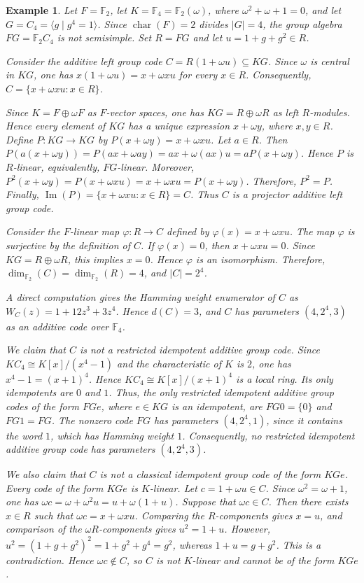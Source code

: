 \documentclass[11pt]{article}
\newtheorem{example}[theorem]{Example}
\begin{document}
\begin{example}\label{ex:nonsemisimple-projector}
Let $F=\mathbb{F}_2$, let
$K=\mathbb{F}_4=\mathbb{F}_2(\omega)$, where
$\omega^2+\omega+1=0$, and let
$G=C_4=\langle g\mid g^4=1\rangle$. Since
$\operatorname{char}(F)=2$ divides $|G|=4$, the group algebra
$FG=\mathbb{F}_2C_4$ is not semisimple. Set $R=FG$ and let
$u=1+g+g^2\in R$.

Consider the additive left group code
$C=R(1+\omega u)\subseteq KG$. Since $\omega$ is central in $KG$, one has
$x(1+\omega u)=x+\omega xu$ for every $x\in R$. Consequently,
$C=\{x+\omega xu:x\in R\}$.

Since $K=F\oplus\omega F$ as $F$-vector spaces, one has
$KG=R\oplus\omega R$ as left $R$-modules. Hence every element of $KG$ has a
unique expression $x+\omega y$, where $x,y\in R$. Define
$P:KG\longrightarrow KG$ by $P(x+\omega y)=x+\omega xu$. Let $a\in R$.
Then $P(a(x+\omega y))=P(ax+\omega ay)=ax+\omega(ax)u=aP(x+\omega y)$.
Hence $P$ is $R$-linear, equivalently, $FG$-linear. Moreover,
$P^2(x+\omega y)=P(x+\omega xu)=x+\omega xu=P(x+\omega y)$. Therefore,
$P^2=P$. Finally,
$\operatorname{Im}(P)=\{x+\omega xu:x\in R\}=C$. Thus $C$ is a projector
additive left group code.

Consider the $F$-linear map $\varphi:R\longrightarrow C$ defined by
$\varphi(x)=x+\omega xu$. The map $\varphi$ is surjective by the definition
of $C$. If $\varphi(x)=0$, then $x+\omega xu=0$. Since
$KG=R\oplus\omega R$, this implies $x=0$. Hence $\varphi$ is an
isomorphism. Therefore,
$\dim_{\mathbb{F}_2}(C)=\dim_{\mathbb{F}_2}(R)=4$, and $|C|=2^4$.

A direct computation gives the Hamming weight enumerator of $C$ as
$W_C(z)=1+12z^3+3z^4$. Hence $d(C)=3$, and $C$ has parameters
$(4,2^4,3)$ as an additive code over $\mathbb{F}_4$.

We claim that $C$ is not a restricted idempotent additive group code. Since
$KC_4\cong K[x]/(x^4-1)$ and the characteristic of $K$ is $2$, one has
$x^4-1=(x+1)^4$. Hence $KC_4\cong K[x]/(x+1)^4$ is a local ring. Its only
idempotents are $0$ and $1$. Thus, the only restricted idempotent additive
group codes of the form $FGe$, where $e\in KG$ is an idempotent, are
$FG0=\{0\}$ and $FG1=FG$. The nonzero code $FG$ has parameters
$(4,2^4,1)$, since it contains the word $1$, which has Hamming weight $1$.
Consequently, no restricted idempotent additive group code has parameters
$(4,2^4,3)$.

We also claim that $C$ is not a classical idempotent group code of the form
$KGe$. Every code of the form $KGe$ is $K$-linear. Let
$c=1+\omega u\in C$. Since $\omega^2=\omega+1$, one has
$\omega c=\omega+\omega^2u=u+\omega(1+u)$. Suppose that $\omega c\in C$.
Then there exists $x\in R$ such that
$\omega c=x+\omega xu$. Comparing the $R$-components gives $x=u$, and
comparison of the $\omega R$-components gives $u^2=1+u$. However,
$u^2=(1+g+g^2)^2=1+g^2+g^4=g^2$, whereas $1+u=g+g^2$. This is a
contradiction. Hence $\omega c\notin C$, so $C$ is not $K$-linear and cannot
be of the form $KGe$.


\end{example}
\end{document}

